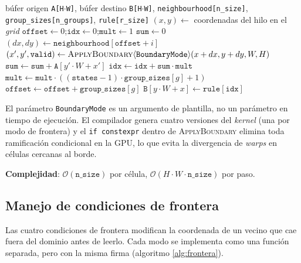 \begin{breakablealgorithm}
\caption{stepKernel$\langle$\texttt{BoundaryMode}$\rangle$: un paso de evolución del autómata celular}
\label{alg:step-ca}
\begin{algorithmic}[1]
\Require búfer origen \texttt{A[H$\cdot$W]}, búfer destino \texttt{B[H$\cdot$W]}, \texttt{neighbourhood[n\_size]}, \texttt{group\_sizes[n\_groups]}, \texttt{rule[r\_size]}
\State $(x, y) \gets$ coordenadas del hilo en el \textit{grid}
 \State \Return \EndIf
\State $\texttt{offset} \gets 0$;\quad $\texttt{idx} \gets 0$;\quad $\texttt{mult} \gets 1$
    \State $\texttt{sum} \gets 0$
        \State $(dx, dy) \gets \texttt{neighbourhood}[\texttt{offset} + i]$
        \State $(x', y', \texttt{valid}) \gets \textsc{ApplyBoundary}\langle\texttt{BoundaryMode}\rangle(x + dx, y + dy, W, H)$
            \State $\texttt{sum} \gets \texttt{sum} + \texttt{A}[y' \cdot W + x']$
        \EndIf
    \EndFor
    \State $\texttt{idx} \gets \texttt{idx} + \texttt{sum} \cdot \texttt{mult}$
    \State $\texttt{mult} \gets \texttt{mult} \cdot ((\texttt{states} - 1) \cdot \texttt{group\_sizes}[g] + 1)$
    \State $\texttt{offset} \gets \texttt{offset} + \texttt{group\_sizes}[g]$
\EndFor
\State $\texttt{B}[y \cdot W + x] \gets \texttt{rule}[\texttt{idx}]$
\end{algorithmic}
\end{breakablealgorithm}

El parámetro \texttt{BoundaryMode} es un argumento de plantilla, no un parámetro en tiempo de ejecución. El compilador genera cuatro versiones del \textit{kernel} (una por modo de frontera) y el \texttt{if constexpr} dentro de \textsc{ApplyBoundary} elimina toda ramificación condicional en la GPU, lo que evita la divergencia de \textit{warps} en células cercanas al borde.

\textbf{Complejidad}: $\mathcal{O}(\texttt{n\_size})$ por célula, $\mathcal{O}(H \cdot W \cdot \texttt{n\_size})$ por paso.

\subsection{Manejo de condiciones de frontera}

Las cuatro condiciones de frontera modifican la coordenada de un vecino que cae fuera del dominio antes de leerlo. Cada modo se implementa como una función separada, pero con la misma firma (algoritmo \ref{alg:frontera}).

